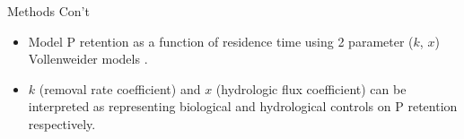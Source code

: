 \documentclass[final,hyperref={pdfpagelabels=false}]{beamer}
\begin{document}
\begin{frame}[t]
\begin{columns}[t]
\begin{column}{.465\textwidth}
\begin{block}{Methods Con't}
\begin{itemize}
\item Model P retention as a function of residence time using 2 parameter ($k$, $x$) Vollenweider models \cite{Brettreviewreassessmentlake2007}. 
\vspace{1em}
\item $k$ (removal rate coefficient) and $x$ (hydrologic flux coefficient) can be interpreted as representing biological and hydrological controls on P retention respectively.

\end{itemize}


\end{block}

% 
% 
% 

\vspace{1em}


\end{column}
\end{columns}
\end{frame}
\end{document}
